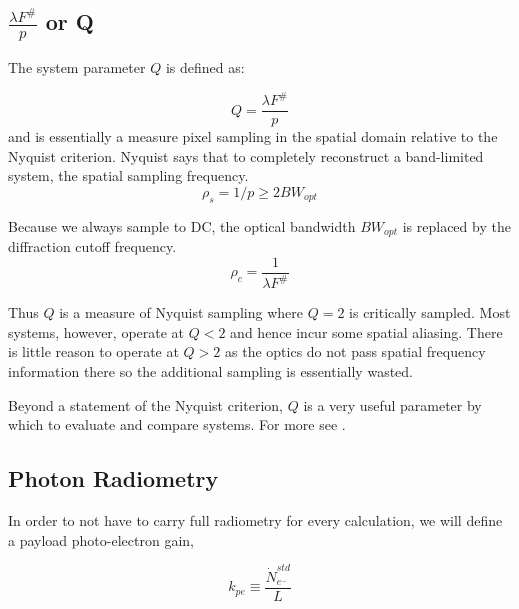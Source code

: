 \documentclass[10pt,journal]{IEEEtran}  %
\begin{document}
\subsection{$\frac{\lambda F^\#}{p}$ or Q}
\label{sec:q}

The system parameter $Q$ is defined as:

\begin{equation}
Q = \frac{\lambda F^\#}{p}
\label{eq:Q}
\end{equation}
and is essentially a measure pixel sampling in the spatial domain relative to the Nyquist criterion.  Nyquist says that to completely reconstruct a band-limited system, the spatial sampling frequency. 
\begin{equation*}
    \rho_s = 1/p \geq 2 BW_{opt}
\end{equation*}

Because we always sample to DC, the optical bandwidth $BW_{opt}$ is replaced by the diffraction cutoff frequency.
\begin{equation*}
    \rho_c = \frac{1}{\lambda F^\#}
\end{equation*}

Thus $Q$ is a measure of Nyquist sampling where $Q=2$ is critically sampled.  Most systems, however, operate at $Q < 2$ and hence incur some spatial aliasing.  There is little reason to operate at $Q > 2$ as the optics do not pass spatial frequency information there so the additional sampling is essentially wasted.


Beyond a statement of the Nyquist criterion, $Q$ is a very useful parameter by which to evaluate and compare systems.  For more see \cite{fiete_q}.  

\subsection{Photon Radiometry}

In order to not have to carry full radiometry for every calculation, we will define a payload photo-electron gain, 

\begin{equation}
k_{pe} \equiv \frac{\dot{N}_{e^-}^{std}}{L}
\label{eq:k_pe}
\end{equation}
\end{document}
